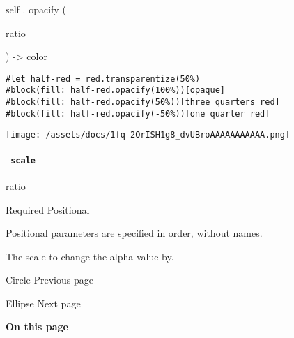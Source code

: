 self { . } { opacify } (

{ \href{/docs/reference/layout/ratio/}{ratio} }

) -\textgreater{} \href{/docs/reference/visualize/color/}{color}

\begin{verbatim}
#let half-red = red.transparentize(50%)
#block(fill: half-red.opacify(100%))[opaque]
#block(fill: half-red.opacify(50%))[three quarters red]
#block(fill: half-red.opacify(-50%))[one quarter red]
\end{verbatim}

\texttt{[image: /assets/docs/1fq--2OrISH1g8\_dvUBroAAAAAAAAAAA.png]}

\paragraph{\texorpdfstring{\texttt{\ scale\ }}{ scale }}\label{definitions-opacify-scale}

\href{/docs/reference/layout/ratio/}{ratio}

{Required} {{ Positional }}

\label{definitions-opacify-scale-positional-tooltip}
Positional parameters are specified in order, without names.

The scale to change the alpha value by.

\href{/docs/reference/visualize/circle/}{\pandocbounded{}}

{ Circle } { Previous page }

\href{/docs/reference/visualize/ellipse/}{\pandocbounded{}}

{ Ellipse } { Next page }

\textbf{On this page}

